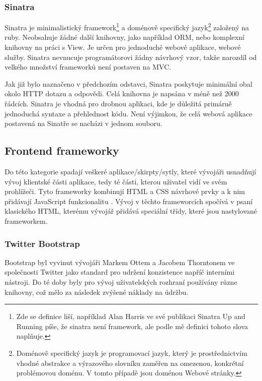 \subsubsection{Sinatra}
Sinatra je minimalistický framework\footnote{Zde se definice liší, například Alan Harris ve své publikaci Sinatra Up and Running píše, že sinatra není framework, ale podle mě definici tohoto slova naplňuje.} a doménově specifický jazyk\footnote{Doménově specifický jazyk je programovací jazyk, který je prostřednictvím vhodné abstrakce a výrazového slovníku zaměřen na omezenou, konkrétní problémovou doménu. V tomto případě jsou doménou Webové stránky.} založený na ruby. Neobsahuje žádné další knihovny, jako například ORM, nebo komplexní knihovny na práci s View. Je určen pro jednoduché webové aplikace, webové služby. Sinatra nevnucuje programátorovi žádny návrhový vzor, takže narozdíl od velkého množství frameworků není postaven na MVC.\cite{harris2011sinatra}

Jak již bylo naznačeno v předchozím odstavci, Sinatra poskytuje minimální obal okolo HTTP dotazu a odpovědi. Celá knihovna je napsána v méně než 2000 řádcích\cite{harris2011sinatra}. Sinatra je vhodná pro drobnou aplikaci, kde je důležitá primárně jednoduchá syntaxe a přehlednost kódu. Není výjimkou, že celá webová aplikace postavená na Sinatře se nacházi v jednom souboru\cite{harris2011sinatra}.

\subsection{Frontend frameworky}
Do této kategorie spadají veškeré aplikace/skirpty/sytly, které vývojáři usnadňují vývoj klientské části aplikace, tedy té části, kterou uživatel vidí ve svém prohlížeči. Tyto frameworky kombinují HTML a CSS návrhové prvky a k nim přidávají JavaScript funkcionalitu \cite{website:wiki:bootstrap}\cite{website:boilerplate}. Vývoj v těchto frameworcích spočívá v psaní klasického HTML, kterému vývojář přidává speciální třídy, které jsou nastylované frameworkem\cite{website:wiki:bootstrap}.

\subsubsection{Twitter Bootstrap}
Bootstrap byl vyvinut vývojáři Markem Ottem a Jacobem Thorntonem ve společnosti Twitter jako standard pro udržení konzistence napříč interními nástroji. Do té doby byly pro vývoj uživatelských rozhraní používány různe knihovny, což mělo za následek zvýšené náklady na údržbu.

